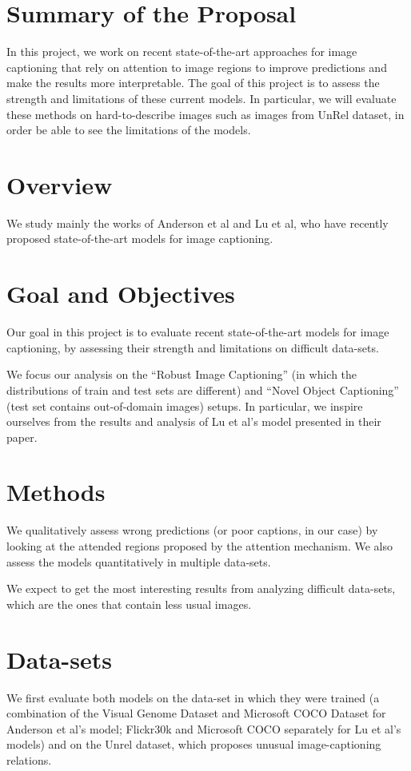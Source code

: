 \section*{Summary of the Proposal}

In this project, we work on recent state-of-the-art approaches for image captioning that rely on attention to image regions to improve predictions and make the results more interpretable. The goal of this project is to assess the strength and limitations of these current models. In particular, we will evaluate these methods on hard-to-describe images such as images from UnRel dataset, in order be able to see the limitations of the models.

\section*{Overview}

We study mainly the works of Anderson et al\cite{BottomUpTopDown} and Lu et al\cite{Baby}, who have recently proposed state-of-the-art models for image captioning.


\section*{Goal and Objectives}

Our goal in this project is to evaluate recent state-of-the-art models for image captioning, by assessing their strength and limitations on difficult data-sets.

We focus our analysis on the “Robust Image Captioning” (in which the distributions of train and test sets are different) and “Novel Object Captioning” (test set contains out-of-domain images) setups. In particular, we inspire ourselves from the results and analysis of Lu et al's model presented in their paper.

\section*{Methods}

We qualitatively assess wrong predictions (or poor captions, in our case) by looking at the attended regions proposed by the attention mechanism. We also assess the models quantitatively in multiple data-sets.

We expect to get the most interesting results from analyzing difficult data-sets, which are the ones that contain less usual images.

\section*{Data-sets}

We first evaluate both models on the data-set in which they were trained (a combination of the Visual Genome Dataset and Microsoft COCO Dataset for Anderson et al's model; Flickr30k and Microsoft COCO separately for Lu et al's models) and on the Unrel dataset\cite{Unrel}, which proposes unusual image-captioning relations.
